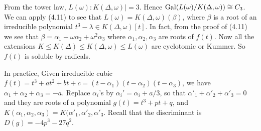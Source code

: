 \documentclass[a4paper]{article}
\begin{document}
From the tower law, $L(\omega):K(\Delta,\omega)| = 3$. Hence $\operatorname{Gal}(L(\omega)/K(\Delta,\omega)) \cong C_3$. We can apply (4.11) to see that $L(\omega) = K(\Delta,\omega) (\beta)$, where $\beta$ is a root of an irreducible polynomial $t^3-\lambda \in K(\Delta,\omega)[t]$. In fact, from the proof of (4.11) we see that $\beta = \alpha_1 + \omega\alpha_2+\omega^2\alpha_3$ where $\alpha_1,\alpha_2,\alpha_3$ are roots of $f(t)$. Now all the extensions $K \leq K(\Delta) \leq K(\Delta,\omega) \leq L(\omega)$ are cyclotomic or Kummer. So $f(t)$ is soluble by radicals.

In practice, Given irreducible cubic $f(t) = t^3+at^2+bt+c = (t-\alpha_1)(t-\alpha_2)(t-\alpha_3)$, we have $\alpha_1+\alpha_2+\alpha_3 = -a$. Replace $\alpha_i$'s by $\alpha_i' = \alpha_i + a/3$, so that $\alpha'_1+\alpha'_2+\alpha'_3 = 0$ and they are roots of a polynomial $g(t) = t^3+pt+q$, and $K(\alpha_1,\alpha_2,\alpha_3) = K(\alpha'_1,\alpha'_2,\alpha'_3$. Recall that the discriminant is $D(g) = -4p^3 - 27q^2$.
\end{document}
